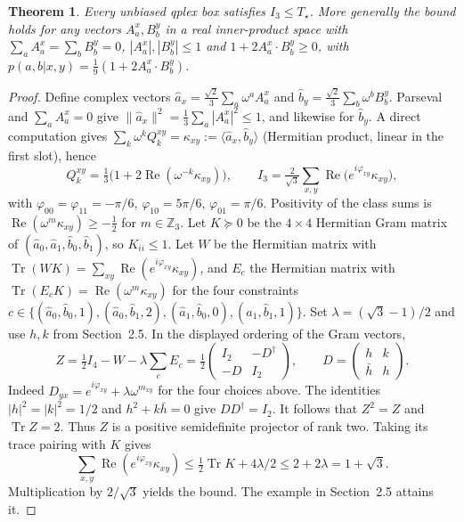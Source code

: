 \documentclass[11pt]{article}
\newtheorem{theorem}{Theorem}
\theoremstyle{definition}
\newcommand{\Tq}{T_{\star}}
\newcommand{\tr}{\operatorname{Tr}}
\newcommand{\re}{\operatorname{Re}}
\newcommand{\PSD}{\succeq}
\begin{document}
\begin{theorem}\label{thm:flat}
Every unbiased qplex box satisfies $I_3\le\Tq$. More generally the bound holds for any vectors $A^x_a,B^y_b$ in a
real inner-product space with $\sum_aA^x_a=\sum_bB^y_b=0$, $|A^x_a|,|B^y_b|\le1$ and
$1+2A^x_a\cdot B^y_b\ge0$, with $p(a,b|x,y)=\tfrac19(1+2A^x_a\cdot B^y_b)$.
\end{theorem}

\begin{proof}
Define complex vectors $\hat a_x=\tfrac{\sqrt2}{3}\sum_a\omega^aA^x_a$ and $\hat b_y=\tfrac{\sqrt2}{3}\sum_b\omega^bB^y_b$.
Parseval and $\sum_aA^x_a=0$ give $\|\hat a_x\|^2=\tfrac13\sum_a|A^x_a|^2\le1$, and likewise for $\hat b_y$.
A direct computation gives $\sum_k\omega^kQ^{xy}_k=\kappa_{xy}:=\langle\hat a_x,\hat b_y\rangle$ (Hermitian product,
linear in the first slot), hence
\[
Q^{xy}_k=\tfrac13\bigl(1+2\re(\omega^{-k}\kappa_{xy})\bigr),\qquad
I_3=\tfrac{2}{\sqrt3}\sum_{x,y}\re\bigl(e^{i\varphi_{xy}}\kappa_{xy}\bigr),
\]
with $\varphi_{00}=\varphi_{11}=-\pi/6$, $\varphi_{10}=5\pi/6$, $\varphi_{01}=\pi/6$. Positivity of the class sums is
$\re(\omega^m\kappa_{xy})\ge-\tfrac12$ for $m\in\mathbb{Z}_3$. Let $K\PSD0$ be the $4\times4$ Hermitian Gram matrix of
$(\hat a_0,\hat a_1,\hat b_0,\hat b_1)$, so $K_{ii}\le1$. Let $W$ be the Hermitian matrix with
$\tr(WK)=\sum_{xy}\re(e^{i\varphi_{xy}}\kappa_{xy})$, and $E_{c}$ the Hermitian matrix with
$\tr(E_cK)=\re(\omega^{m}\kappa_{xy})$ for the four constraints
$c\in\{(\hat a_0,\hat b_0,1),(\hat a_0,\hat b_1,2),(\hat a_1,\hat b_0,0),(\hat a_1,\hat b_1,1)\}$. Set $\lambda=(\sqrt3-1)/2$ and use $h,k$ from Section~2.5. In the displayed ordering of the Gram vectors,
\[
Z=\tfrac12 I_4-W-\lambda\sum_c E_c
=\tfrac12\begin{pmatrix}I_2&-D^\dagger\\-D&I_2\end{pmatrix},
\qquad
D=\begin{pmatrix}h&k\\ \bar h&h\end{pmatrix}.
\]
Indeed $D_{yx}=e^{i\varphi_{xy}}+\lambda\omega^{m_{xy}}$ for the four choices above.
The identities $|h|^2=|k|^2=1/2$ and $h^2+k\bar h=0$ give $DD^\dagger=I_2$.
It follows that $Z^2=Z$ and $\tr Z=2$. Thus $Z$ is a positive semidefinite projector of rank two.
Taking its trace pairing with $K$ gives
\[
\sum_{x,y}\re(e^{i\varphi_{xy}}\kappa_{xy})
\le\tfrac12\tr K+4\lambda/2\le 2+2\lambda=1+\sqrt3.
\]
Multiplication by $2/\sqrt3$ yields the bound. The example in Section~2.5 attains it.
\end{proof}
\end{document}
